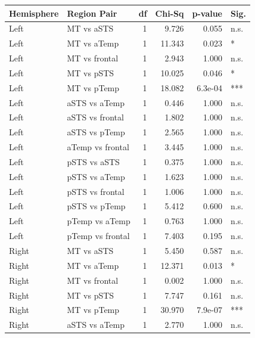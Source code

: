 \begin{table}[h]
\centering
\begin{tabular}{llrrrl}
\toprule
 Hemisphere   & Region Pair      &   df &   Chi-Sq &   p-value & Sig.   \\
\midrule
 Left         & MT vs aSTS       &    1 &    9.726 &     0.055 & n.s.   \\
 Left         & MT vs aTemp      &    1 &   11.343 &     0.023 & *      \\
 Left         & MT vs frontal    &    1 &    2.943 &     1.000 & n.s.   \\
 Left         & MT vs pSTS       &    1 &   10.025 &     0.046 & *      \\
 Left         & MT vs pTemp      &    1 &   18.082 &   6.3e-04 & ***    \\
 Left         & aSTS vs aTemp    &    1 &    0.446 &     1.000 & n.s.   \\
 Left         & aSTS vs frontal  &    1 &    1.802 &     1.000 & n.s.   \\
 Left         & aSTS vs pTemp    &    1 &    2.565 &     1.000 & n.s.   \\
 Left         & aTemp vs frontal &    1 &    3.445 &     1.000 & n.s.   \\
 Left         & pSTS vs aSTS     &    1 &    0.375 &     1.000 & n.s.   \\
 Left         & pSTS vs aTemp    &    1 &    1.623 &     1.000 & n.s.   \\
 Left         & pSTS vs frontal  &    1 &    1.006 &     1.000 & n.s.   \\
 Left         & pSTS vs pTemp    &    1 &    5.412 &     0.600 & n.s.   \\
 Left         & pTemp vs aTemp   &    1 &    0.763 &     1.000 & n.s.   \\
 Left         & pTemp vs frontal &    1 &    7.403 &     0.195 & n.s.   \\
 Right        & MT vs aSTS       &    1 &    5.450 &     0.587 & n.s.   \\
 Right        & MT vs aTemp      &    1 &   12.371 &     0.013 & *      \\
 Right        & MT vs frontal    &    1 &    0.002 &     1.000 & n.s.   \\
 Right        & MT vs pSTS       &    1 &    7.747 &     0.161 & n.s.   \\
 Right        & MT vs pTemp      &    1 &   30.970 &   7.9e-07 & ***    \\
 Right        & aSTS vs aTemp    &    1 &    2.770 &     1.000 & n.s.   \\

\end{tabular}
\end{table}
